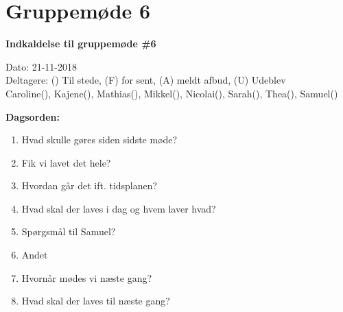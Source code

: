 \section{Gruppemøde 6}

\vspace{0.5 cm}
\textbf{Indkaldelse til gruppemøde \#6}

Dato: 21-11-2018 \\
Deltagere: () Til stede, (F) for sent, (A) meldt afbud, (U) Udeblev \\
Caroline(), Kajene(), Mathias(), Mikkel(), Nicolai(), Sarah(), Thea(), Samuel() 

\vspace{0.1 cm}
\textbf{Dagsorden:}

\begin{enumerate}
	\item Hvad skulle gøres siden sidste møde?
	\item Fik vi lavet det hele?
	\item Hvordan går det ift. tidsplanen?
	\item Hvad skal der laves i dag og hvem laver hvad?
	\item Spørgsmål til Samuel?
	\item Andet
	\item Hvornår mødes vi næste gang?
	\item Hvad skal der laves til næste gang?
\end{enumerate}

